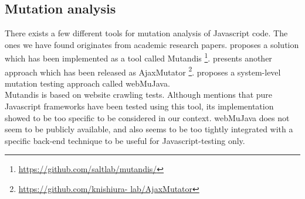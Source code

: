 \subsection{Mutation analysis}

There exists a few different tools for mutation analysis of Javascript
code. The ones we have found originates from academic research papers.
\citet{paper:mutandis} proposes a solution which has been implemented as
a tool called Mutandis
\footnote{\url{https://github.com/saltlab/mutandis/}}.
\citet{paper:ajaxmutator} presents another approach which has been
released as AjaxMutator \footnote{\url{https://github.com/knishiura-
lab/AjaxMutator}}. \citet{paper:webmujava} proposes a system-level
mutation testing approach called webMuJava.\\

Mutandis is based on website crawling tests. Although
\citeauthor{paper:mutandis} mentions that pure Javascript frameworks
have been tested using this tool, its implementation showed to be too
specific to be considered in our context. webMuJava does not seem to be
publicly available, and also seems to be too tightly integrated with a
specific back-end technique to be useful for Javascript-testing only.
